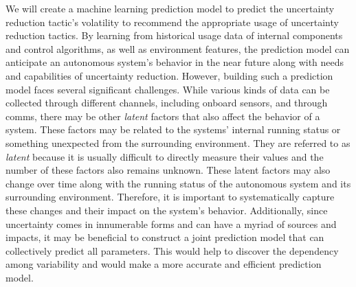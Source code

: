 \documentclass[12pt]{article}
\begin{document}
We will create a machine learning prediction model to predict the uncertainty reduction tactic's volatility to recommend the appropriate usage of uncertainty reduction tactics. By learning from historical usage data of internal components and control algorithms, as well as environment features, the prediction model can anticipate an autonomous system's behavior in the near future along with needs and capabilities of uncertainty reduction. However, building such a prediction model faces several significant challenges. While various kinds of data can be collected through different channels, including onboard sensors, and through comms, there may be other {\em latent} factors that also affect the behavior of a system. These factors may be related to the systems' internal running status or something unexpected from the surrounding environment. They are referred to as {\em latent} because it is usually difficult to directly measure their values and the number of these factors also remains unknown. These latent factors may also change over time along with the running status of the autonomous system and its surrounding environment. Therefore, it is important to systematically capture these changes and their impact on the system's behavior. Additionally, since uncertainty comes in innumerable forms and can have a myriad of sources and impacts, it may be beneficial to construct a joint prediction model that can collectively predict all parameters. This would help to discover the dependency among variability and would make a more accurate and efficient prediction model.
\end{document}

